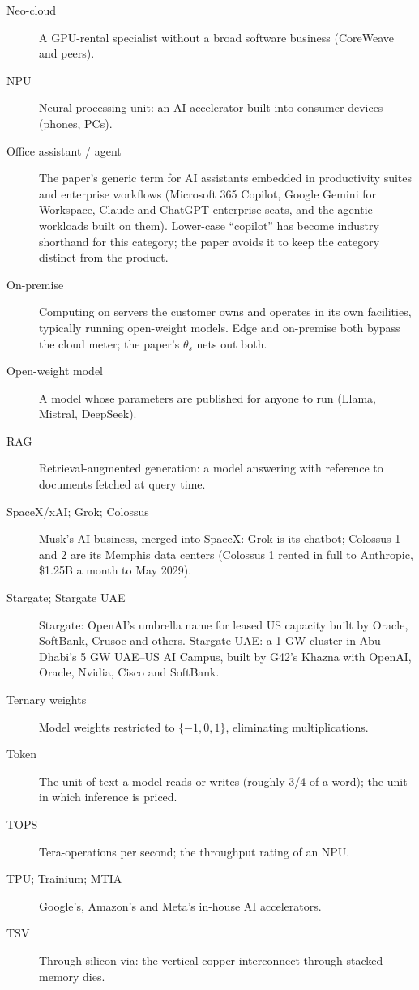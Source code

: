 \documentclass[11pt,letterpaper]{article}
\begin{document}
\begin{description}
\item[Neo-cloud] A GPU-rental specialist without a broad software business (CoreWeave and peers).
\item[NPU] Neural processing unit: an AI accelerator built into consumer devices (phones, PCs).
\item[Office assistant / agent] The paper's generic term for AI assistants embedded in productivity suites and enterprise workflows (Microsoft 365 Copilot, Google Gemini for Workspace, Claude and ChatGPT enterprise seats, and the agentic workloads built on them). Lower-case ``copilot'' has become industry shorthand for this category; the paper avoids it to keep the category distinct from the product.
\item[On-premise] Computing on servers the customer owns and operates in its own facilities, typically running open-weight models. Edge and on-premise both bypass the cloud meter; the paper's $\theta_s$ nets out both.
\item[Open-weight model] A model whose parameters are published for anyone to run (Llama, Mistral, DeepSeek).
\item[RAG] Retrieval-augmented generation: a model answering with reference to documents fetched at query time.
\item[SpaceX/xAI; Grok; Colossus] Musk's AI business, merged into SpaceX: Grok is its chatbot; Colossus 1 and 2 are its Memphis data centers (Colossus 1 rented in full to Anthropic, \$1.25B a month to May 2029).
\item[Stargate; Stargate UAE] Stargate: OpenAI's umbrella name for leased US capacity built by Oracle, SoftBank, Crusoe and others. Stargate UAE: a 1 GW cluster in Abu Dhabi's 5 GW UAE--US AI Campus, built by G42's Khazna with OpenAI, Oracle, Nvidia, Cisco and SoftBank.
\item[Ternary weights] Model weights restricted to $\{-1,0,1\}$, eliminating multiplications.
\item[Token] The unit of text a model reads or writes (roughly 3/4 of a word); the unit in which inference is priced.
\item[TOPS] Tera-operations per second; the throughput rating of an NPU.
\item[TPU; Trainium; MTIA] Google's, Amazon's and Meta's in-house AI accelerators.
\item[TSV] Through-silicon via: the vertical copper interconnect through stacked memory dies.
\end{description}
\end{document}
